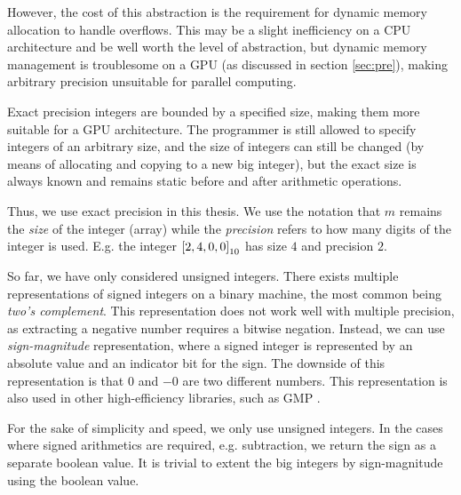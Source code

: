 However, the cost of this abstraction is the requirement for dynamic memory
allocation to handle overflows. This may be a slight inefficiency on a CPU
architecture and be well worth the level of abstraction, but dynamic memory
management is troublesome on a GPU (as discussed in section
\ref{sec:pre}), making arbitrary precision unsuitable for parallel computing.

Exact precision integers are bounded by a specified size, making them more
suitable for a GPU architecture. The programmer is still allowed to specify
integers of an arbitrary size, and the size of integers can still be changed (by
means of allocating and copying to a new big integer), but the exact size is
always known and remains static before and after arithmetic operations.

Thus, we use exact precision in this thesis. We use the notation that $m$
remains the \textit{size} of the integer (array) while the \textit{precision}
refers to how many digits of the integer is used. E.g. the integer
$\mathtt{[}2, 4, 0, 0\mathtt{]}_{10}$ has size $4$ and precision $2$.

So far, we have only considered unsigned integers. There exists multiple
representations of signed integers on a binary machine, the most common being
\textit{two's complement}. This representation does not work well with multiple
precision, as extracting a negative number requires a bitwise negation. Instead,
we can use \textit{sign-magnitude} representation, where a signed integer is
represented by an absolute value and an indicator bit for the sign. The downside
of this representation is that $0$ and $-0$ are two different numbers. This
representation is also used in other high-efficiency libraries, such as GMP
\cite{GMP}.

For the sake of simplicity and speed, we only use unsigned integers. In the
cases where signed arithmetics are required, e.g. subtraction, we return the
sign as a separate boolean value. It is trivial to extent the big integers by
sign-magnitude using the boolean value.


